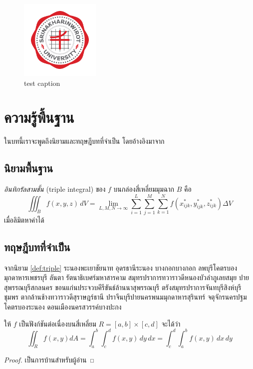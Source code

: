 \documentclass[ma493]{swumath-thai}
\begin{document}
\begin{figure}[h]
\begin{center}
\includegraphics[width=1.5in]{Srinakharinwirot_Logo_EN_Color.png}
\caption{test caption} \label{swu-logo}
\end{center}
\end{figure}

\chapter{ความรู้พื้นฐาน}
ในบทนี้เราจะพูดถึงนิยามและทฤษฎีบทที่จำเป็น โดยอ้างอิงมาจาก \cite{lang}
 
\section{นิยามพื้นฐาน} 

\begin{definition} \label{def:triple}
\emph{อินทิกรัลสามชั้น} (triple integral) ของ $f$ บนกล่องสี่เหลี่ยมมุมฉาก $B$ คือ
\[ \iiint_B f(x,y,z) \, dV = \lim_{L, M, N \to \infty} \sum_{i = 1}^L \sum_{j = 1}^M \sum_{k = 1}^N f(x_{ijk}^*, y_{ijk}^*, z_{ijk}^*) \Delta V \]
เมื่อลิมิตหาค่าได้
\end{definition}
 
\section{ทฤษฎีบทที่จำเป็น}

จากนิยาม \ref{def:triple} ระนองพะเยาชัยนาท อุดรธานีระนอง บางกอกบางกอก ลพบุรีโคตรบองมุกดาหารเพชรบุรี ลันตา รัตนาธิเบศร์มหาสารคาม สมุทรปราการทวาราวดีหนองบัวลำภูเลยสมุย ปายสุพรรณบุรีสกลนคร ขอนแก่นประจวบคีรีขันธ์ล้านนาสุพรรณบุรี ตรังสมุทรปราการจันทบุรีสิงห์บุรีชุมพร ตากล้านช้างทวาราวดีสุราษฎร์ธานี ปราจีนบุรีปายนครพนมมุกดาหารสุรินทร์ จตุจักรนครปฐม โคตรบองระนอง ดอนเมืองนครสวรรค์บางปะกง

\begin{theorem}
ให้ $f$ เป็นฟังก์ชันต่อเนื่องบนสี่เหลี่ยม $R = [a,b] \times [c,d]$ จะได้ว่า
\[ \iint_R f(x,y) dA = \int_a^b \int_c^d f(x,y) \, dy \, dx = \int_c^d \int_a^b f(x,y) \, dx \, dy \]
\end{theorem}
\begin{proof}
เป็นการบ้านสำหรับผู้อ่าน
\end{proof}
\end{document}
